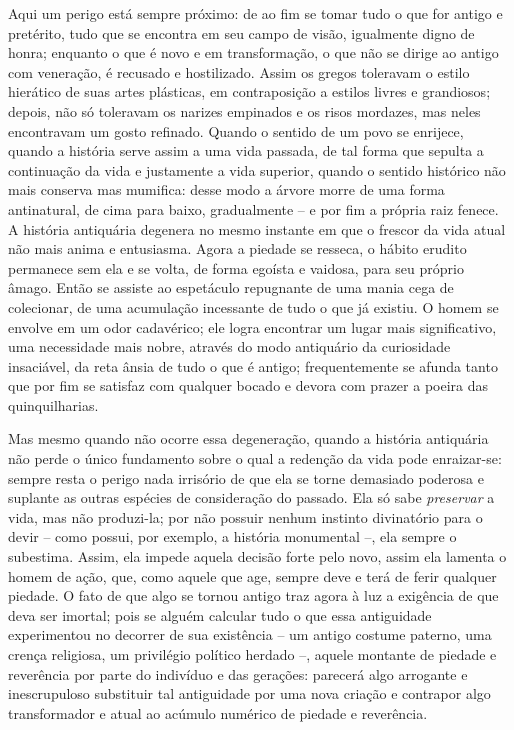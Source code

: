 Aqui um perigo está sempre próximo: de ao fim se tomar tudo o que for
antigo e pretérito, tudo que se encontra em seu campo de visão,
igualmente digno de honra; enquanto o que é novo e em transformação, o
que não se dirige ao antigo com veneração, é recusado e hostilizado.
Assim os gregos toleravam o estilo hierático de suas artes plásticas, em
contraposição a estilos livres e grandiosos; depois, não só toleravam os
narizes empinados e os risos mordazes, mas neles encontravam um gosto
refinado. Quando o sentido de um povo se enrijece, quando a história
serve assim a uma vida passada, de tal forma que sepulta a continuação
da vida e justamente a vida superior, quando o sentido histórico não
mais conserva mas mumifica: desse modo a árvore morre de uma forma
antinatural, de cima para baixo, gradualmente -- e por fim a própria
raiz fenece. A história antiquária degenera no mesmo instante em que o
frescor da vida atual não mais anima e entusiasma. Agora a piedade se
resseca, o hábito erudito permanece sem ela e se volta, de forma egoísta
e vaidosa, para seu próprio âmago. Então se assiste ao espetáculo
repugnante de uma mania cega de colecionar, de uma acumulação incessante
de tudo o que já existiu. O homem se envolve em um odor cadavérico; ele
logra encontrar um lugar mais significativo, uma necessidade mais nobre,
através do modo antiquário da curiosidade insaciável, da reta ânsia de
tudo o que é antigo; frequentemente se afunda tanto que por fim se
satisfaz com qualquer bocado e devora com prazer a poeira das
quinquilharias.

Mas mesmo quando não ocorre essa degeneração, quando a história
antiquária não perde o único fundamento sobre o qual a redenção da vida
pode enraizar-se: sempre resta o perigo nada irrisório de que ela se
torne demasiado poderosa e suplante as outras espécies de consideração
do passado. Ela só sabe \emph{preservar} a vida, mas não produzi-la; por
não possuir nenhum instinto divinatório para o devir -- como possui, por
exemplo, a história monumental --, ela sempre o subestima. Assim, ela
impede aquela decisão forte pelo novo, assim ela lamenta o homem de
ação, que, como aquele que age, sempre deve e terá de ferir qualquer
piedade. O fato de que algo se tornou antigo traz agora à luz a
exigência de que deva ser imortal; pois se alguém calcular tudo o que
essa antiguidade experimentou no decorrer de sua existência -- um antigo
costume paterno, uma crença religiosa, um privilégio político herdado
--, aquele montante de piedade e reverência por parte do indivíduo e das
gerações: parecerá algo arrogante e inescrupuloso substituir tal
antiguidade por uma nova criação e contrapor algo transformador e atual
ao acúmulo numérico de piedade e reverência.

